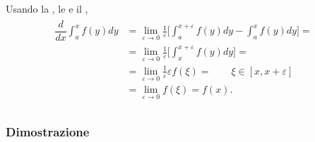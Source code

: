 \documentclass[letterpaper,10pt,english]{jupyterBook}
\begin{document}
\sphinxAtStartPar
{} Usando la {\hyperref[\detokenize{ch/infinitesimal_calculus/derivatives:infinitesimal-calculus-derivatives-def}]{}}, le {\hyperref[\detokenize{ch/infinitesimal_calculus/integrals:infinitesimal-calculus-integrals-def-definite-prop}]{}} e il {\hyperref[\detokenize{ch/infinitesimal_calculus/integrals:infinitesimal-calculus-integrals-thm-avg}]{}},
\begin{equation*}
\begin{split}\begin{aligned}
\dfrac{d}{dx} \int_{a}^x f(y) dy & = \lim_{\varepsilon \rightarrow 0 }\frac{1}{\varepsilon} \Big[ \int_{a}^{x+\varepsilon} f(y) dy - \int_{a}^{x} f(y) dy \Big] = \\
& = \lim_{\varepsilon \rightarrow 0 }\frac{1}{\varepsilon} \Big[ \int_{x}^{x+\varepsilon} f(y) dy \Big] = \\
& = \lim_{\varepsilon \rightarrow 0 } \frac{1}{\varepsilon} \varepsilon f(\xi) = \qquad \xi \in [x,x+\varepsilon] \\
& = \lim_{\varepsilon \rightarrow 0 } f(\xi) = f(x) . \\
\end{aligned}\end{split}
\end{equation*}\label{\detokenize{ch/infinitesimal_calculus/integrals:infinitesimal-calculus-integrals-thm-fund-reynolds}}\subsubsection*{Dimostrazione}
\end{document}
